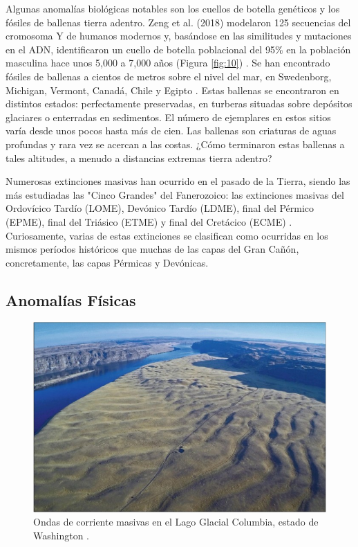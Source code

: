 \documentclass[10pt,twocolumn,letterpaper]{article}
\begin{document}
Algunas anomalías biológicas notables son los cuellos de botella genéticos y los fósiles de ballenas tierra adentro. Zeng et al. (2018) modelaron 125 secuencias del cromosoma Y de humanos modernos y, basándose en las similitudes y mutaciones en el ADN, identificaron un cuello de botella poblacional del 95\% en la población masculina hace unos 5,000 a 7,000 años (Figura \ref{fig:10}) \cite{62}. Se han encontrado fósiles de ballenas a cientos de metros sobre el nivel del mar, en Swedenborg, Michigan, Vermont, Canadá, Chile y Egipto \cite{63,64,65,66}. Estas ballenas se encontraron en distintos estados: perfectamente preservadas, en turberas situadas sobre depósitos glaciares o enterradas en sedimentos. El número de ejemplares en estos sitios varía desde unos pocos hasta más de cien. Las ballenas son criaturas de aguas profundas y rara vez se acercan a las costas. ¿Cómo terminaron estas ballenas a tales altitudes, a menudo a distancias extremas tierra adentro?

Numerosas extinciones masivas han ocurrido en el pasado de la Tierra, siendo las más estudiadas las "Cinco Grandes" del Fanerozoico: las extinciones masivas del Ordovícico Tardío (LOME), Devónico Tardío (LDME), final del Pérmico (EPME), final del Triásico (ETME) y final del Cretácico (ECME) \cite{88,89}. Curiosamente, varias de estas extinciones se clasifican como ocurridas en los mismos períodos históricos que muchas de las capas del Gran Cañón, concretamente, las capas Pérmicas y Devónicas.

\subsection{Anomalías Físicas}

\begin{figure}[b]
\begin{center}
   \includegraphics[width=1\linewidth]{columbia.jpg}
\end{center}
   \caption{Ondas de corriente masivas en el Lago Glacial Columbia, estado de Washington \cite{80}.}
\label{fig:11}
\label{fig:onecol}
\end{figure}
\end{document}
